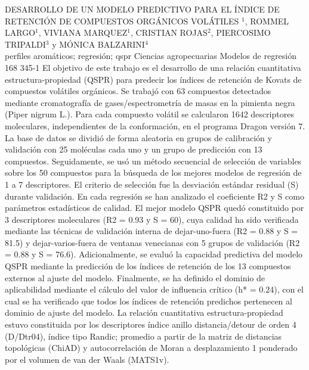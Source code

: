 \A
{DESARROLLO DE UN MODELO PREDICTIVO PARA EL ÍNDICE DE RETENCIÓN DE COMPUESTOS ORGÁNICOS VOLÁTILES}
{$^1$, ROMMEL LARGO$^1$, VIVIANA MARQUEZ$^1$, CRISTIAN ROJAS$^2$, PIERCOSIMO TRIPALDI$^3$ y MÓNICA BALZARINI$^4$}
{
\\}
{perfiles aromáticos; regresión; qspr} 
 {Ciencias agropecuarias} 
 {Modelos de regresión} 
 {168} 
 {345-1}
{El objetivo de este trabajo es el desarrollo de una relación cuantitativa estructura-propiedad (QSPR) para predecir los índices de retención de Kovats de compuestos volátiles orgánicos. Se trabajó con 63 compuestos detectados mediante cromatografía de gases/espectrometría de masas en la pimienta negra (Piper nigrum L.). Para cada compuesto volátil se calcularon 1642 descriptores moleculares, independientes de la conformación, en el programa Dragon versión 7. La base de datos se dividió de forma aleatoria en grupos de calibración y validación con 25 moléculas cada uno y un grupo de predicción con 13 compuestos. Seguidamente, se usó un método secuencial de selección de variables sobre los 50 compuestos para la búsqueda de los mejores modelos de regresión de 1 a 7 descriptores. El criterio de selección fue la desviación estándar residual (S) durante validación. En cada regresión se han analizado el coeficiente R2 y S como parámetros estadísticos de calidad. El mejor modelo QSPR quedó constituido por 3 descriptores moleculares (R2 = 0.93 y S = 60), cuya calidad ha sido verificada mediante las técnicas de validación interna de dejar-uno-fuera (R2 = 0.88 y S = 81.5) y dejar-varios-fuera de ventanas venecianas con 5 grupos de validación (R2 = 0.88 y S = 76.6). Adicionalmente, se evaluó la capacidad predictiva del modelo QSPR mediante la predicción de los índices de retención de los 13 compuestos externos al ajuste del modelo. Finalmente, se ha definido el dominio de aplicabilidad mediante el cálculo del valor de influencia crítico (h* = 0.24), con el cual se ha verificado que todos los índices de retención predichos pertenecen al dominio de ajuste del modelo. La relación cuantitativa estructura-propiedad estuvo constituida por los descriptores índice anillo distancia/detour de orden 4 (D/Dtr04), índice tipo Randic; promedio a partir de la matriz de distancias topológicas (ChiAD) y autocorrelación de Moran a desplazamiento 1 ponderado por el volumen de van der Waals (MATS1v).}
